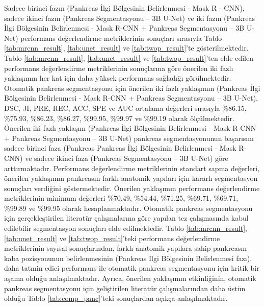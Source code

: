 Sadece birinci fazın (Pankreas İlgi Bölgesinin Belirlenmesi - Mask R - CNN), sadece ikinci fazın (Pankreas Segmentasyonu – 3B U-Net) ve iki fazın (Pankreas İlgi Bölgesinin Belirlenmesi - Mask R-CNN + Pankreas Segmentasyonu – 3B U-Net) performans değerlendirme metriklerinin sonuçları sırasıyla Tablo \ref{tab:mrcnn_result}, \ref{tab:unet_result} ve \ref{tab:twop_result}'te gösterilmektedir. Tablo \ref{tab:mrcnn_result}, \ref{tab:unet_result} ve \ref{tab:twop_result}'ten elde edilen performans değerlendirme metriklerinin sonuçlarına göre önerilen iki fazlı yaklaşımın her kat için daha yüksek performans sağladığı görülmektedir. Otomatik pankreas segmentasyonu için önerilen iki fazlı yaklaşımın (Pankreas İlgi Bölgesinin Belirlenmesi - Mask R-CNN + Pankreas Segmentasyonu – 3B U-Net), DSC, JI, PRE, REC, ACC, SPE ve AUC ortalama değerleri sırasıyla \%86.15, \%75.93, \%86.23, \%86.27, \%99.95, \%99.97 ve \%99.19 olarak ölçülmektedir. Önerilen iki fazlı yaklaşım (Pankreas İlgi Bölgesinin Belirlenmesi - Mask R-CNN + Pankreas Segmentasyonu – 3B U-Net) pankreas segmentasyonunun başarısını sadece birinci faza (Pankreas Pankreas İlgi Bölgesinin Belirlenmesi - Mask R-CNN) ve sadece ikinci faza (Pankreas Segmentasyonu – 3B U-Net) göre arttırmaktadır. Performans değerlendirme metriklerinin standart sapma değerleri, önerilen yaklaşımın pankreasın farklı anatomik yapıları için kararlı segmentasyon sonuçları verdiğini göstermektedir. Önerilen yaklaşımın performans değerlendirme metriklerinin minimum değerleri \%70.49, \%54.44, \%71.25, \%69.71, \%69.71, \%99.89 ve \%99.95 olarak hesaplanmaktadır. Otomatik pankreas segmentasyonu için gerçekleştirilen literatür çalışmalarına göre yapılan tez çalışmasında kabul edilebilir segmentasyon sonuçları elde edilmektedir. Tablo \ref{tab:mrcnn_result}, \ref{tab:unet_result} ve \ref{tab:twop_result}'teki performans değerlendirme metriklerinin sayısal sonuçlarından, farklı anatomik yapılara sahip pankreasın kaba pozisyonunun belirlenmesinin (Pankreas İlgi Bölgesinin Belirlenmesi fazı), daha tatmin edici performans ile otomatik pankreas segmentasyonu için kritik bir aşama olduğu anlaşılmaktadır. Ayrıca, önerilen yaklaşımın etkinliğinin, otomatik pankreas segmentasyonu için geliştirilen literatür çalışmalarından daha üstün olduğu Tablo \ref{tab:comp_panc}'teki sonuçlardan açıkça anlaşılmaktadır.

